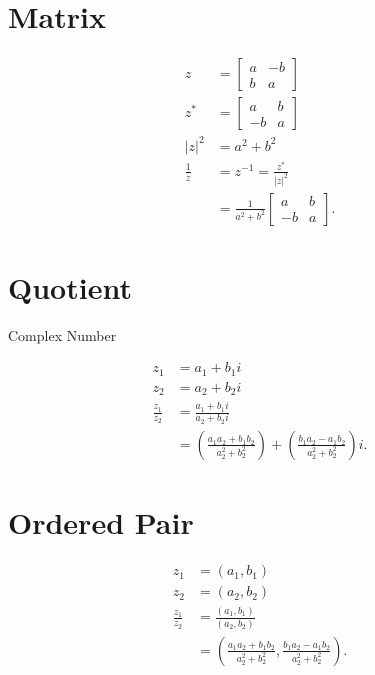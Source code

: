 \documentclass[10pt]{article}
\begin{document}
\section{Matrix}
$$
\begin{aligned}
z & =\left[\begin{array}{cc}
a & -b \\
b & a
\end{array}\right] \\
z^{*} & =\left[\begin{array}{cc}
a & b \\
-b & a
\end{array}\right] \\
|z|^{2} & =a^{2}+b^{2} \\
\frac{1}{z} & =z^{-1}=\frac{z^{*}}{|z|^{2}} \\
& =\frac{1}{a^{2}+b^{2}}\left[\begin{array}{cc}
a & b \\
-b & a
\end{array}\right] .
\end{aligned}
$$

\section{Quotient}
Complex Number

$$
\begin{aligned}
z_{1} & =a_{1}+b_{1} i \\
z_{2} & =a_{2}+b_{2} i \\
\frac{z_{1}}{z_{2}} & =\frac{a_{1}+b_{1} i}{a_{2}+b_{2} i} \\
& =\left(\frac{a_{1} a_{2}+b_{1} b_{2}}{a_{2}^{2}+b_{2}^{2}}\right)+\left(\frac{b_{1} a_{2}-a_{1} b_{2}}{a_{2}^{2}+b_{2}^{2}}\right) i .
\end{aligned}
$$

\section{Ordered Pair}
$$
\begin{aligned}
z_{1} & =\left(a_{1}, b_{1}\right) \\
z_{2} & =\left(a_{2}, b_{2}\right) \\
\frac{z_{1}}{z_{2}} & =\frac{\left(a_{1}, b_{1}\right)}{\left(a_{2}, b_{2}\right)} \\
& =\left(\frac{a_{1} a_{2}+b_{1} b_{2}}{a_{2}^{2}+b_{2}^{2}}, \frac{b_{1} a_{2}-a_{1} b_{2}}{a_{2}^{2}+b_{2}^{2}}\right) .
\end{aligned}
$$
\end{document}
